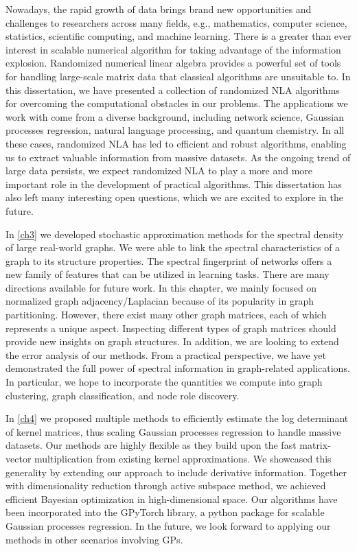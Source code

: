 Nowadays, the rapid growth of data brings brand new opportunities and challenges
to researchers across many fields, e.g., mathematics, computer science,
statistics, scientific computing, and machine learning. There is a greater than
ever interest in scalable numerical algorithm for taking advantage of the
information explosion. Randomized numerical linear algebra provides a powerful
set of tools for handling large\hyp{}scale matrix data that classical algorithms
are unsuitable to. In this dissertation, we have presented a collection of
randomized NLA algorithms for overcoming the computational obstacles in our
problems. The applications we work with come from a diverse background,
including network science, Gaussian processes regression, natural language
processing, and quantum chemistry. In all these cases, randomized NLA has led to
efficient and robust algorithms, enabling us to extract valuable information
from massive datasets. As the ongoing trend of large data persists, we expect
randomized NLA to play a more and more important role in the development of
practical algorithms. This dissertation has also left many interesting open
questions, which we are excited to explore in the future.

In \cref{ch3} we developed stochastic approximation methods for the spectral
density of large real\hyp{}world graphs. We were able to link the spectral
characteristics of a graph to its structure properties. The spectral
fingerprint of networks offers a new family of features that can be utilized in
learning tasks. There are many directions available for future work. In this
chapter, we mainly focused on normalized graph adjacency/Laplacian because of
its popularity in graph partitioning. However, there exist many other graph
matrices, each of which represents a unique aspect. Inspecting different types
of graph matrices should provide new insights on graph structures. In addition,
we are looking to extend the error analysis of our methods. From a practical
perspective, we have yet demonstrated the full power of spectral information in
graph\hyp{}related applications. In particular, we hope to incorporate the
quantities we compute into graph clustering, graph classification, and node role
discovery.

In \cref{ch4} we proposed multiple methods to efficiently estimate the log
determinant of kernel matrices, thus scaling Gaussian processes regression to
handle massive datasets. Our methods are highly flexible as they build upon the
fast matrix\hyp{}vector multiplication from existing kernel approximations. We
showcased this generality by extending our approach to include derivative
information. Together with dimensionality reduction through active subspace
method, we achieved efficient Bayesian optimization in high\hyp{}dimensional
space. Our algorithms have been incorporated into the GPyTorch library, a python
package for scalable Gaussian processes regression. In the future, we look
forward to applying our methods in other scenarios involving GPs.

